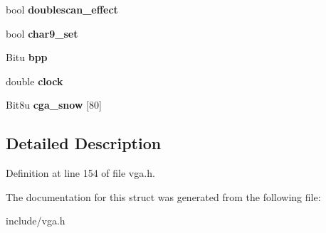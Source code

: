\begin{DoxyCompactItemize}
\item 
\hypertarget{structVGA__Draw_a46e63c6f7ed6b2b659a472116adfc9a1}{bool {\bfseries doublescan\-\_\-effect}}\label{structVGA__Draw_a46e63c6f7ed6b2b659a472116adfc9a1}

\item 
\hypertarget{structVGA__Draw_abaa2681be86bf5437d6a0923e35eb105}{bool {\bfseries char9\-\_\-set}}\label{structVGA__Draw_abaa2681be86bf5437d6a0923e35eb105}

\item 
\hypertarget{structVGA__Draw_a6e0453a000b7fa89a66becfd79a9901c}{Bitu {\bfseries bpp}}\label{structVGA__Draw_a6e0453a000b7fa89a66becfd79a9901c}

\item 
\hypertarget{structVGA__Draw_a6025d548974fd43c733ffd89f080d9e5}{double {\bfseries clock}}\label{structVGA__Draw_a6025d548974fd43c733ffd89f080d9e5}

\item 
\hypertarget{structVGA__Draw_a427d28481b72ec7e7c0a8c8b79d62bf2}{Bit8u {\bfseries cga\-\_\-snow} \mbox{[}80\mbox{]}}\label{structVGA__Draw_a427d28481b72ec7e7c0a8c8b79d62bf2}

\end{DoxyCompactItemize}


\subsection{Detailed Description}


Definition at line 154 of file vga.\-h.



The documentation for this struct was generated from the following file\-:\begin{DoxyCompactItemize}
\item 
include/vga.\-h\end{DoxyCompactItemize}
